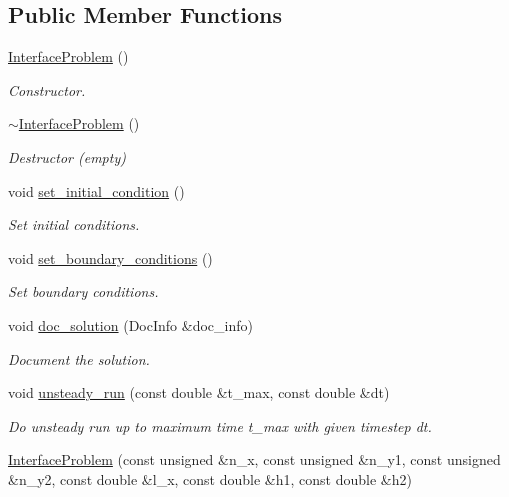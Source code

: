 \subsection*{Public Member Functions}
\begin{DoxyCompactItemize}
\item 
\hyperlink{classInterfaceProblem_a5889be7fc8eab5d222f1bfb750c845ba}{Interface\+Problem} ()
\begin{DoxyCompactList}\small\item\em Constructor. \end{DoxyCompactList}\item 
\hyperlink{classInterfaceProblem_a90c191f8046069099b199743e7ce7111}{$\sim$\+Interface\+Problem} ()
\begin{DoxyCompactList}\small\item\em Destructor (empty) \end{DoxyCompactList}\item 
void \hyperlink{classInterfaceProblem_a0d3af8378c4f0a6e38636be958c300d5}{set\+\_\+initial\+\_\+condition} ()
\begin{DoxyCompactList}\small\item\em Set initial conditions. \end{DoxyCompactList}\item 
void \hyperlink{classInterfaceProblem_a844445832ad7a32aa9f5d03ffdb40ebb}{set\+\_\+boundary\+\_\+conditions} ()
\begin{DoxyCompactList}\small\item\em Set boundary conditions. \end{DoxyCompactList}\item 
void \hyperlink{classInterfaceProblem_a49714e35e94f7d2af0b6ddd22b851f52}{doc\+\_\+solution} (Doc\+Info \&doc\+\_\+info)
\begin{DoxyCompactList}\small\item\em Document the solution. \end{DoxyCompactList}\item 
void \hyperlink{classInterfaceProblem_adf1f4e43d10939e4323e0e315b711085}{unsteady\+\_\+run} (const double \&t\+\_\+max, const double \&dt)
\begin{DoxyCompactList}\small\item\em Do unsteady run up to maximum time t\+\_\+max with given timestep dt. \end{DoxyCompactList}\item 
\hyperlink{classInterfaceProblem_ae8ecf0f5a7217bc9428d8798807de37d}{Interface\+Problem} (const unsigned \&n\+\_\+x, const unsigned \&n\+\_\+y1, const unsigned \&n\+\_\+y2, const double \&l\+\_\+x, const double \&h1, const double \&h2)

\end{DoxyCompactItemize}

